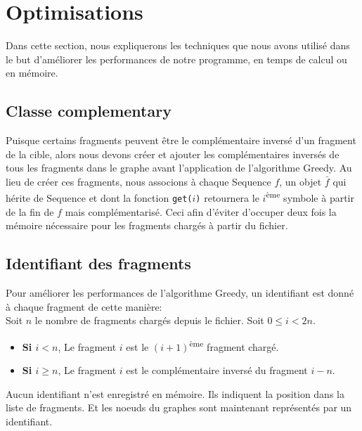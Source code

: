 \section{Optimisations}
Dans cette section, nous expliquerons les techniques que nous avons utilisé dans le but d'améliorer les performances de notre programme, en temps de calcul ou en mémoire.

\subsection{Classe complementary}
Puisque certains fragments peuvent être le complémentaire inversé d'un fragment de la cible, alors nous devons créer et ajouter les complémentaires inversés de tous les fragments dans le graphe avant l'application de l'algorithme Greedy.
Au lieu de créer ces fragments, nous associons à chaque Sequence $f$, un objet $\bar{f}$ qui hérite de Sequence et dont la fonction \texttt{get($i$)} retournera le $i$\textsuperscript{ème} symbole à partir de la fin de $f$ mais complémentarisé.
Ceci afin d'éviter d'occuper deux fois la mémoire nécessaire pour les fragments chargés à partir du fichier.

\subsection{Identifiant des fragments}
Pour améliorer les performances de l'algorithme Greedy, un identifiant est donné à chaque fragment de cette manière:\\
Soit $n$ le nombre de fragments chargés depuis le fichier. Soit $0 \le i < 2n$.
\begin{itemize}
 \item \textbf{Si $i < n$}, Le fragment $i$ est le $(i+1)$\textsuperscript{ème} fragment chargé.
 \item \textbf{Si $i \ge n$}, Le fragment $i$ est le complémentaire inversé du fragment $i-n$.
\end{itemize}
Aucun identifiant n'est enregistré en mémoire. Ils indiquent la position dans la liste de fragments.
Et les noeuds du graphes sont maintenant représentés par un identifiant.

